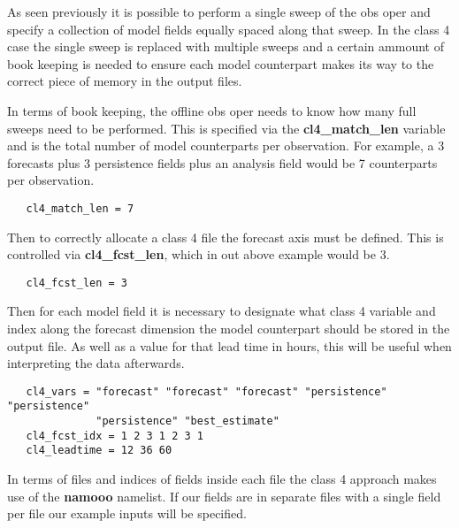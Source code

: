 \documentclass[NEMO_book]{subfiles}
\begin{document}
As seen previously it is possible to perform a single sweep of the
obs oper and specify a collection of model fields equally spaced 
along that sweep. In the class 4 case the single sweep is replaced
with multiple sweeps and a certain ammount of book keeping is
needed to ensure each model counterpart makes its way to the 
correct piece of memory in the output files.

\noindent
\linebreak
In terms of book keeping, the offline obs oper needs to know how many
full sweeps need to be performed. This is specified via the 
\textbf{cl4\_match\_len} variable and is the total number of model
counterparts per observation. For example, a 3 forecasts plus 3 persistence
fields plus an analysis field would be 7 counterparts per observation.

\begin{alltt}
\tiny
\begin{verbatim}
   cl4_match_len = 7
\end{verbatim}
\end{alltt}

Then to correctly allocate a class 4 file the forecast axis must be defined. This
is controlled via \textbf{cl4\_fcst\_len}, which in out above example would be 3.

\begin{alltt}
\tiny
\begin{verbatim}
   cl4_fcst_len = 3
\end{verbatim}
\end{alltt}

Then for each model field it is necessary to designate what class 4 variable and
index along the forecast dimension the model counterpart should be stored in the
output file. As well as a value for that lead time in hours, this will be useful
when interpreting the data afterwards. 

\begin{alltt}
\tiny
\begin{verbatim}
   cl4_vars = "forecast" "forecast" "forecast" "persistence" "persistence"
              "persistence" "best_estimate"
   cl4_fcst_idx = 1 2 3 1 2 3 1
   cl4_leadtime = 12 36 60 
\end{verbatim}
\end{alltt}

In terms of files and indices of fields inside each file the class 4 approach
makes use of the \textbf{namooo} namelist. If our fields are in separate files
with a single field per file our example inputs will be specified.
\end{document}
